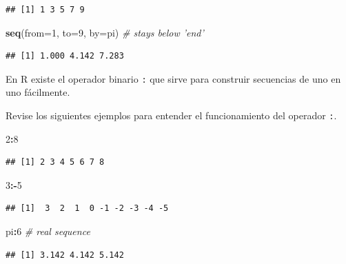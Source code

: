 \documentclass[10pt,]{krantz}
\makeatletter
\newenvironment{Shaded}{\begin{snugshade}}{\end{snugshade}}
\newcommand{\KeywordTok}[1]{\textcolor[rgb]{0.13,0.29,0.53}{\textbf{#1}}}
\newcommand{\DataTypeTok}[1]{\textcolor[rgb]{0.13,0.29,0.53}{#1}}
\newcommand{\DecValTok}[1]{\textcolor[rgb]{0.00,0.00,0.81}{#1}}
\newcommand{\CommentTok}[1]{\textcolor[rgb]{0.56,0.35,0.01}{\textit{#1}}}
\newcommand{\OperatorTok}[1]{\textcolor[rgb]{0.81,0.36,0.00}{\textbf{#1}}}
\newcommand{\NormalTok}[1]{#1}
\let\proglang=\textsf
\newenvironment{kframe}{%
\medskip{}
\setlength{\fboxsep}{.8em}
 \def\at@end@of@kframe{}%
 \ifinner\ifhmode%
  \def\at@end@of@kframe{\end{minipage}}%
  \begin{minipage}{\columnwidth}%
 \fi\fi%
 \def\FrameCommand##1{\hskip\@totalleftmargin \hskip-\fboxsep
 \colorbox{shadecolor}{##1}\hskip-\fboxsep
     \hskip-\linewidth \hskip-\@totalleftmargin \hskip\columnwidth}%
 \MakeFramed {\advance\hsize-\width
   \@totalleftmargin\z@ \linewidth\hsize
   \@setminipage}}%
 {\par\unskip\endMakeFramed%
 \at@end@of@kframe}
\renewenvironment{Shaded}{\begin{kframe}}{\end{kframe}}
\let\BeginKnitrBlock\begin \let\EndKnitrBlock\end
\makeatother
\begin{document}
\begin{verbatim}
## [1] 1 3 5 7 9
\end{verbatim}

\begin{Shaded}
\begin{Highlighting}[]
\KeywordTok{seq}\NormalTok{(}\DataTypeTok{from=}\DecValTok{1}\NormalTok{, }\DataTypeTok{to=}\DecValTok{9}\NormalTok{, }\DataTypeTok{by=}\NormalTok{pi) }\CommentTok{# stays below 'end'}
\end{Highlighting}
\end{Shaded}

\begin{verbatim}
## [1] 1.000 4.142 7.283
\end{verbatim}

\BeginKnitrBlock{rmdnote}
En \proglang{R} existe el operador binario \texttt{:} que sirve para
construir secuencias de uno en uno fácilmente.
\EndKnitrBlock{rmdnote}

Revise los siguientes ejemplos para entender el funcionamiento del
operador \texttt{:}.

\begin{Shaded}
\begin{Highlighting}[]
\DecValTok{2}\OperatorTok{:}\DecValTok{8}
\end{Highlighting}
\end{Shaded}

\begin{verbatim}
## [1] 2 3 4 5 6 7 8
\end{verbatim}

\begin{Shaded}
\begin{Highlighting}[]
\DecValTok{3}\OperatorTok{:-}\DecValTok{5}
\end{Highlighting}
\end{Shaded}

\begin{verbatim}
## [1]  3  2  1  0 -1 -2 -3 -4 -5
\end{verbatim}

\begin{Shaded}
\begin{Highlighting}[]
\NormalTok{pi}\OperatorTok{:}\DecValTok{6}  \CommentTok{# real sequence}
\end{Highlighting}
\end{Shaded}

\begin{verbatim}
## [1] 3.142 4.142 5.142
\end{verbatim}
\end{document}
